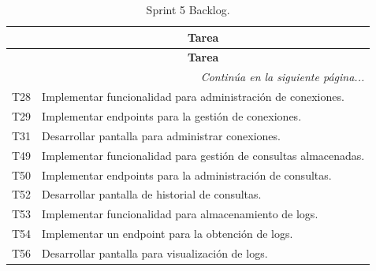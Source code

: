 \begin{longtable}[c]{|c|m{}|}
    \caption{Sprint 5 Backlog.}
    \label{tab:sprintBacklog5} \\
    
    \hline
    \rowcolor{gray!50}
    \multicolumn{1}{|c|}{\textbf{Código}} & \multicolumn{1}{c|}{\textbf{Tarea}} \\
    \hline
    \endfirsthead

    \hline
    \rowcolor{gray!50}
    \multicolumn{1}{|c|}{\textbf{Código}} & \multicolumn{1}{c|}{\textbf{Tarea}} \\
    \hline
    \endhead

    \multicolumn{2}{r}{\textit{Continúa en la siguiente página...}} \\
    \endfoot
    
    \endlastfoot

    T28 & Implementar funcionalidad para administración de conexiones. \\
    \hline
    T29 & Implementar endpoints para la gestión de conexiones. \\
    \hline
    T31 & Desarrollar pantalla para administrar conexiones. \\
    \hline
    T49 & Implementar funcionalidad para gestión de consultas almacenadas. \\
    \hline
    T50 & Implementar endpoints para la administración de consultas. \\
    \hline
    T52 & Desarrollar pantalla de historial de consultas. \\
    \hline
    T53 & Implementar funcionalidad para almacenamiento de logs. \\
    \hline
    T54 & Implementar un endpoint para la obtención de logs. \\
    \hline
    T56 & Desarrollar pantalla para visualización de logs. \\
    \hline
\end{longtable}